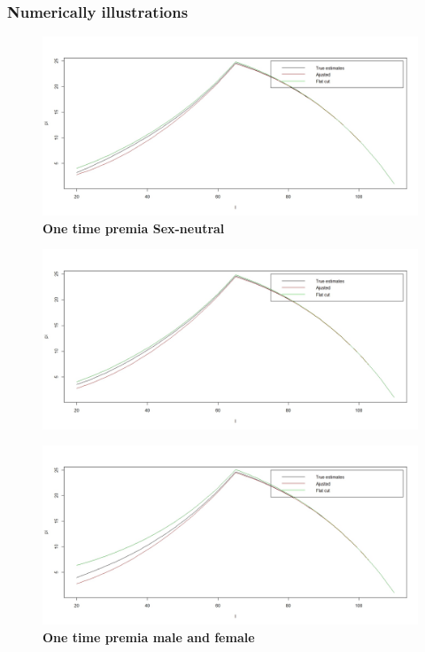 \documentclass{beamer}
\begin{document}
\begin{frame}
\frametitle{Numerically illustrations}
\begin{figure}
  \centering
   \includegraphics[scale=0.2]{sex_neutral_premia.jpeg}
  \caption{\textbf{One time premia Sex-neutral}}
  
\end{figure}

\end{frame}

\begin{frame}

\begin{figure}
  \centering
   \includegraphics[scale=0.16]{male_premia.jpeg}
  
\end{figure}
\begin{figure}
  \centering
   \includegraphics[scale=0.16]{female_premia.jpeg}
  \caption{\textbf{One time premia male and  female}}
  
\end{figure}


\end{frame}
\end{document}
